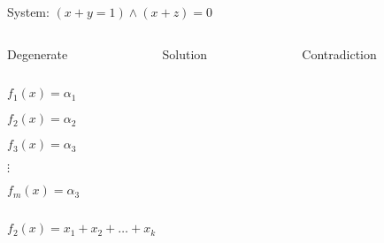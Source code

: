 \begin{frame}

    

\end{frame}

\begin{frame}

    

\end{frame}

\begin{frame}

    System: $(x + y = 1) \land (x + z) = 0$
	\begin{columns}
        \begin{column}{3cm}
            Degenerate
        \end{column}
        \begin{column}{3cm}
            Solution
    \end{column}
        \begin{column}{3cm}
            Contradiction
        \end{column}
    \end{columns}

    
    \begin{columns}
        \begin{column}{3cm}
            
        \end{column}
        \begin{column}{3cm}
            
        \end{column}
        \begin{column}{3cm}
            
        \end{column}
    \end{columns}

\end{frame}


\begin{frame}

    \begin{columns}
        \begin{column}{2.5cm}
            $f_1(x) = \alpha_1$

            $f_2(x) = \alpha_2$

            $f_3(x) = \alpha_3$

            $\vdots$

            $f_m(x) = \alpha_3$
        \end{column}
        \begin{column}{9.5cm}
            
	    \end{column}
    \end{columns}

    $f_2(x) = x_1 + x_2 + \dots + x_k$

\end{frame}
